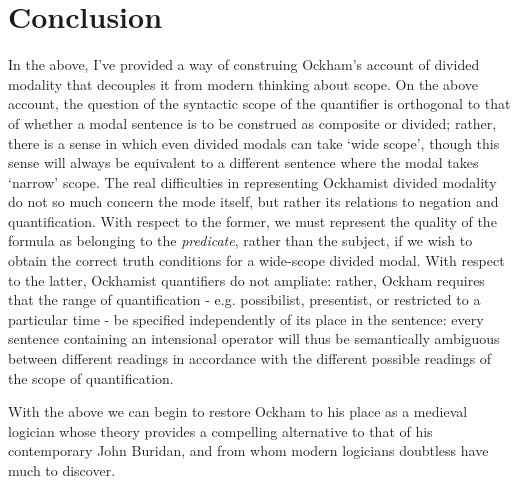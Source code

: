 		\section{Conclusion}
		In the above, I've provided a way of construing Ockham's account of divided modality that decouples it from modern thinking about scope. On the above account, the question of the syntactic scope of the quantifier is orthogonal to that of whether a modal sentence is to be construed as composite or divided; rather, there is a sense in which even divided modals can take `wide scope', though this sense will always be equivalent to a different sentence where the modal takes `narrow' scope. The real difficulties in representing Ockhamist divided modality do not so much concern the mode itself, but rather its relations to negation and quantification. With respect to the former, we must represent the quality of the formula as belonging to the \textit{predicate}, rather than the subject, if we wish to obtain the correct truth conditions for a wide-scope divided modal. With respect to the latter, Ockhamist quantifiers do not ampliate: rather, Ockham requires that the range of quantification - e.g. possibilist, presentist, or restricted to a particular time - be specified independently of its place in the sentence: every sentence containing an intensional operator will thus be semantically ambiguous between different readings in accordance with the different possible readings of the scope of quantification. 
		
		With the above we can begin to restore Ockham to his place as a medieval logician whose theory provides a compelling alternative to that of his contemporary John Buridan, and from whom modern logicians doubtless have much to discover.